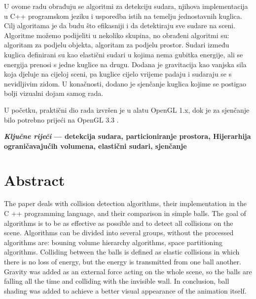 \vspace{5pt}

\noindent

U ovome radu obrađuju se algoritmi za detekciju sudara, njihova implementacija u C++ programskom jeziku i usporedba istih na temelju jednostavnih kuglica. Cilj algoritama je da budu što efikasniji i da detektiraju sve sudare na sceni. Algoritme možemo podijeliti u nekoliko skupina, no obrađeni algoritmi su: algoritam za podjelu objekta, algoritam za podjelu prostor. Sudari između kuglica definirani su kao elastični sudari u kojima nema gubitka energije, ali se energija prenosi s jedne kuglice na drugu. Dodana je gravitacija kao vanjska sila koja djeluje na cijeloj sceni, pa kuglice cijelo vrijeme padaju i sudaraju se s nevidljivim zidom. U konačnosti, dodano je sjenčanje kuglica kojime se postigao bolji vizualni dojam samog rada.

U početku, praktični dio rada izvršen je u alatu OpenGL 1.x, dok je za sjenčanje bilo potrebno prijeći na OpenGL 3.3 .

\vspace{5pt}
%
\noindent \textbf{\textit{Ključne riječi} --- detekcija sudara, particioniranje prostora, Hijerarhija ograničavajućih volumena, elastični sudari, sjenčanje} 




\section*{Abstract}
\vspace{-10pt}
\noindent
The paper deals with collision detection algorithms, their implementation in the C ++ programming language, and their comparison in simple balls. The goal of algorithms is to be as effective as possible and to detect all collisions on the scene. Algorithms can be divided into several groups, without the processed algorithms are: bouning volume hierarchy algorithms, space partitioning algorithms. Colliding between the balls is defined as elastic collisions in which there is no loss of energy, but the energy is transmitted from one ball another. Gravity was added as an external force acting on the whole scene, so the balls are falling all the time and colliding with the invisible wall. In conclusion, ball shading was added to achieve a better visual appearance of the animation itself.

